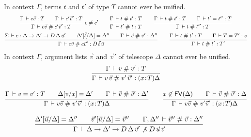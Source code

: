 \documentclass[acmlarge,fleqn]{acmart}\settopmatter{}
\begin{document}
  In context $\Gamma$, terms $t$ and $t'$ of type $T$ cannot ever be unified.
\begin{gather*}
\rux{\Gamma \der c \vec v : T \qquad \Gamma \der c' \vec v' : T
   }{\Gamma \der c \vec v \apart c' \vec v' : T
   }{c \not= c'}
\qquad
\ru{\Gamma \der t \apart t' : T
  }{\Gamma \der t' \apart t : T}
\qquad
\ru{\Gamma \der t \apart t' : T \qquad \Gamma \der t' = t'' : T
  }{\Gamma \der t \apart t'' : T}
\\
\ru{\Sigma \der c : \Delta \to \Delta' \to D\,\Delta \,\vec u' \qquad
    \subst{\vec t}\Delta{\Delta'} = \Delta'' \qquad
    \Gamma \der \vec v \apart \vec v' : \Delta''
  }{\Gamma \der c \vec v \apart c \vec v' : D\,\vec t\,\vec u}
\qquad
\ru{\Gamma \der t \apart t' : T \qquad \Gamma \der T = T' : s
  }{\Gamma \der t \apart t' : T'}
\end{gather*}
In context $\Gamma$, argument lists $\vec v$ and $\vec v'$ of telescope $\Delta$ cannot ever be unified.
\begin{gather*}
\ru{\Gamma \der v \apart v' : T
  }{\Gamma \der v\,\vec v \apart v'\,\vec v' : (x \of T)\Delta}
\\[2ex]
\ru{\Gamma \der v = v' : T \qquad
    \subst v x \Delta = \Delta' \qquad
    \Gamma \der \vec v \apart \vec v' : \Delta'
  }{\Gamma \der v \vec v \apart v' \vec v' : (x \of T) \Delta}
\qquad
\ru{%
    x \not\in\FV(\Delta) \qquad
    \Gamma \der \vec v \apart \vec v' : \Delta
  }{\Gamma \der v \vec v \apart v' \vec v' : (x \of T) \Delta}
\end{gather*}

\begin{gather*}
\ru{\subst {\vec u} \Delta {\Delta'} = \Delta'' \qquad
    \subst {\vec u} \Delta {\vec v'}  = \vec v'' \qquad
    \Gamma, \Delta'' \der \vec v'' \apart \vec v : \Delta''
  }{\Gamma \der \Delta \to \Delta' \to D\,\Delta\,\vec v' \noinstance D\,\vec u\,\vec v
  }
\qquad
\end{gather*}
\end{document}
